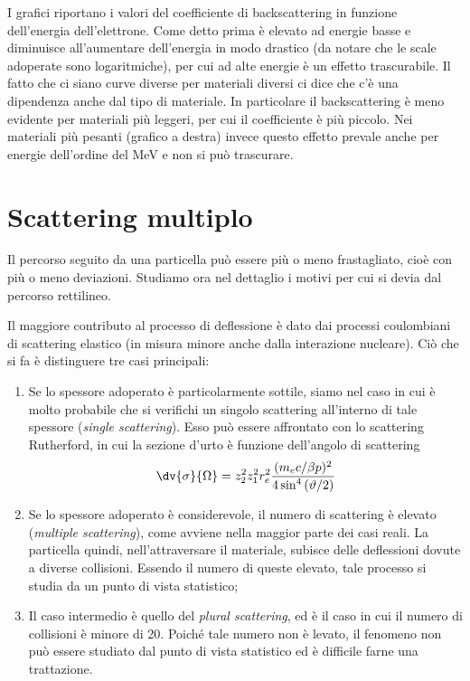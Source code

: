 I grafici riportano i valori del coefficiente di backscattering in funzione dell'energia dell'elettrone. Come detto prima è elevato ad energie basse e diminuisce all'aumentare dell'energia in modo drastico (da notare che le scale adoperate sono logaritmiche), per cui ad alte energie è un effetto trascurabile. Il fatto che ci siano curve diverse per materiali diversi ci dice che c'è una dipendenza anche dal tipo di materiale. In particolare il backscattering è meno evidente per materiali più leggeri, per cui il coefficiente è più piccolo. Nei materiali più pesanti (grafico a destra) invece questo effetto prevale anche per energie dell'ordine del MeV e non si può trascurare.

\section{Scattering multiplo}

Il percorso seguito da una particella può essere più o meno frastagliato, cioè con più o meno deviazioni. Studiamo ora nel dettaglio i motivi per cui si devia dal percorso rettilineo.

Il maggiore contributo al processo di deflessione è dato dai processi coulombiani di scattering elastico (in misura minore anche dalla interazione nucleare). Ciò che si fa è distinguere tre casi principali:

\begin{enumerate}[leftmargin=0.55cm]
    \item Se lo spessore adoperato è particolarmente sottile, siamo nel caso in cui è molto probabile che si verifichi un singolo scattering all'interno di tale spessore (\textit{single scattering}). Esso può essere affrontato con lo scattering Rutherford, in cui la sezione d'urto è funzione dell'angolo di scattering
    \begin{equation*}
        \dv{\sigma}{\Omega}=z_2^2 z_1^2 r_e^2 \frac{(m_ec/\beta p)^2}{4 \sin^4{(\vartheta/2)}}
    \end{equation*}
    \item Se lo spessore adoperato è considerevole, il numero di scattering è elevato (\textit{multiple scattering}), come avviene nella maggior parte dei casi reali. La particella quindi, nell'attraversare il materiale, subisce delle deflessioni dovute a diverse collisioni. Essendo il numero di queste elevato, tale processo si studia da un punto di vista statistico;
    \item Il caso intermedio è quello del \textit{plural scattering}, ed è il caso in cui il numero di collisioni è minore di 20. Poiché tale numero non è levato, il fenomeno non può essere studiato dal punto di vista statistico ed è difficile farne una trattazione.
\end{enumerate}

